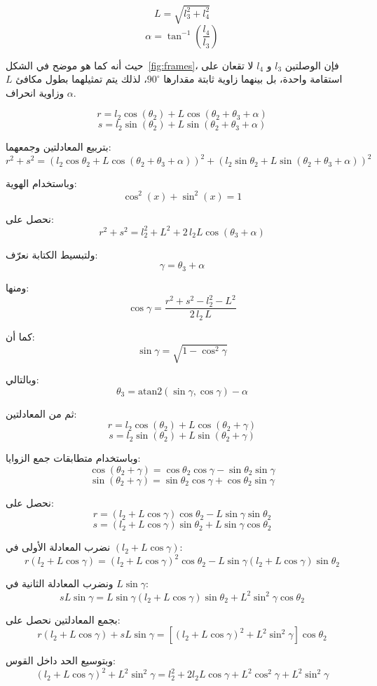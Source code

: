 \[
L = \sqrt{l_3^2 + l_4^2}
\]
\[
\alpha = \tan^{-1}\left(\frac{l_4}{l_3}\right)
\]

حيث أنه كما هو موضح في الشكل~\ref{fig:frames}، فإن الوصلتين $l_3$ و $l_4$ لا تقعان على استقامة واحدة، بل بينهما زاوية ثابتة مقدارها $90^\circ$، لذلك يتم تمثيلهما بطول مكافئ $L$ وزاوية انحراف $\alpha$.

\[
r = l_2 \cos(\theta_2) + L \cos(\theta_2 + \theta_3 + \alpha)
\]
\[
s = l_2 \sin(\theta_2) + L \sin(\theta_2 + \theta_3 + \alpha)
\]

بتربيع المعادلتين وجمعهما:
\[
r^2 + s^2 =
\left(l_2 \cos\theta_2 + L \cos(\theta_2+\theta_3+\alpha)\right)^2 +
\left(l_2 \sin\theta_2 + L \sin(\theta_2+\theta_3+\alpha)\right)^2
\]

وباستخدام الهوية:
\[
\cos^2(x) + \sin^2(x) = 1
\]

نحصل على:
\[
r^2 + s^2 = l_2^2 + L^2 + 2\,l_2 L \cos(\theta_3 + \alpha)
\]

ولتبسيط الكتابة نعرّف:
\[
\gamma = \theta_3 + \alpha
\]

ومنها:
\[
\cos\gamma =
\frac{r^2 + s^2 - l_2^2 - L^2}{2\,l_2\,L}
\]

كما أن:
\[
\sin\gamma = \sqrt{1 - \cos^2\gamma}
\]

وبالتالي:
\[
\theta_3 =
\mathrm{atan2}\left(\sin\gamma,\cos\gamma\right) - \alpha
\]

ثم من المعادلتين:
\[
r = l_2 \cos(\theta_2) + L \cos(\theta_2+\gamma)
\]
\[
s = l_2 \sin(\theta_2) + L \sin(\theta_2+\gamma)
\]

وباستخدام متطابقات جمع الزوايا:
\[
\cos(\theta_2+\gamma)=\cos\theta_2\cos\gamma-\sin\theta_2\sin\gamma
\]
\[
\sin(\theta_2+\gamma)=\sin\theta_2\cos\gamma+\cos\theta_2\sin\gamma
\]

نحصل على:
\[
r = (l_2+L\cos\gamma)\cos\theta_2 - L\sin\gamma\sin\theta_2
\]
\[
s = (l_2+L\cos\gamma)\sin\theta_2 + L\sin\gamma\cos\theta_2
\]

نضرب المعادلة الأولى في $(l_2+L\cos\gamma)$:
\[
r(l_2+L\cos\gamma)
=
(l_2+L\cos\gamma)^2\cos\theta_2
-
L\sin\gamma(l_2+L\cos\gamma)\sin\theta_2
\]

ونضرب المعادلة الثانية في $L\sin\gamma$:
\[
sL\sin\gamma
=
L\sin\gamma(l_2+L\cos\gamma)\sin\theta_2
+
L^2\sin^2\gamma\cos\theta_2
\]

بجمع المعادلتين نحصل على:
\[
r(l_2+L\cos\gamma)+sL\sin\gamma
=
\left[(l_2+L\cos\gamma)^2+L^2\sin^2\gamma\right]\cos\theta_2
\]

وبتوسيع الحد داخل القوس:
\[
(l_2+L\cos\gamma)^2+L^2\sin^2\gamma
=
l_2^2+2l_2L\cos\gamma+L^2\cos^2\gamma+L^2\sin^2\gamma
\]

